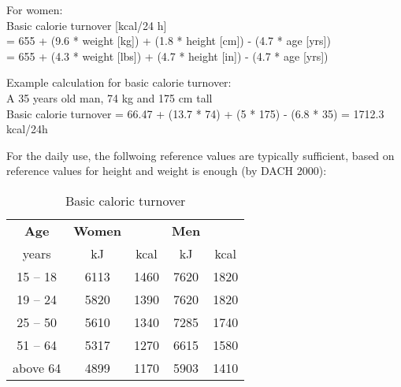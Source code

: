 \documentclass[../main.tex]{subfiles}
\begin{document}
\vspace{3mm}

\noindent For women:\\
Basic calorie turnover [kcal/24 h] \\
= 655 + (9.6 * weight [kg]) + (1.8 * height [cm]) - (4.7 * age [yrs]) \\
= 655 + (4.3 * weight [lbs]) + (4.7 * height [in]) - (4.7 * age [yrs])

\vspace{3mm}

\noindent Example calculation for basic calorie turnover:\\
A 35 years old man, 74 kg and 175 cm tall\\
Basic calorie turnover = 66.47 + (13.7 * 74) + (5 * 175) - (6.8 * 35) = 1712.3 kcal/24h

\vspace{3mm}

For the daily use, the follwoing reference values are typically sufficient,
based on reference values for height and weight is enough (by DACH 2000):

\begin{table}[htb]
  \centering
  \begin{tabular}{c|c c|c c}
    \textbf{Age} & \textbf{Women} & & \textbf{Men} \\
    years & kJ & kcal & kJ & kcal \\
    \hline
    15 -- 18 & 6113 & 1460 & 7620 & 1820 \\
    19 -- 24 & 5820 & 1390 & 7620 & 1820 \\
    25 -- 50 & 5610 & 1340 & 7285 & 1740 \\
    51 -- 64 & 5317 & 1270 & 6615 & 1580 \\
    above 64 & 4899 & 1170 & 5903 & 1410 \\
  \end{tabular}
  \caption{Basic caloric turnover}
\end{table}
\end{document}

